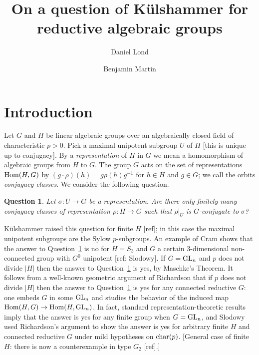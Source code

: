 \documentclass[12pt]{amsart}
\title[On a question of K\"ulshammer for reductive algebraic groups]
{On a question of K\"ulshammer for reductive algebraic groups}
\author[D. Lond]{Daniel Lond}
\author[B.\ Martin]{Benjamin Martin}
\newcommand\ra{\rightarrow}
\numberwithin{equation}{section}
\newtheorem{qn}[equation]{Question}
\theoremstyle{definition}
\theoremstyle{remark}
\theoremstyle{remark}
\begin{document}
\begin{abstract}
\end{abstract}


\maketitle

\section{Introduction}

Let $G$ and $H$ be linear algebraic groups over an algebraically closed field of characteristic $p> 0$.  Pick a maximal unipotent subgroup $U$ of $H$ [this is unique up to conjugacy].  By a {\em representation} of $H$ in $G$ we mean a homomorphism of algebraic groups from $H$ to $G$.  The group $G$ acts on the set of representations ${\rm Hom}(H,G)$ by $(g\cdot \rho)(h)= g\rho(h)g^{-1}$ for $h\in H$ and $g\in G$; we call the orbits {\em conjugacy classes}.  We consider the following question.

\begin{qn}
\label{qn:algKQ}
 Let $\sigma\colon U\ra G$ be a representation.  Are there only finitely many conjugacy classes of representation $\rho\colon H\ra G$ such that $\rho|_U$ is $G$-conjugate to $\sigma$?
\end{qn}

K\"ulshammer raised this question for finite $H$
[ref]; in this case the maximal unipotent subgroups are the Sylow $p$-subgroups.  An example of Cram shows that the answer to Question~\ref{qn:algKQ} is no for $H= S_3$ and $G$ a certain 3-dimensional non-connected group with $G^0$ unipotent [ref: Slodowy].
If $G= {\rm GL}_n$ and $p$ does not divide $|H|$ then the answer to Question~\ref{qn:algKQ} is yes, by Maschke's Theorem.  It follows from a well-known geometric argument of Richardson that if $p$ does not divide $|H|$ then the answer to Question~\ref{qn:algKQ} is yes for any connected reductive $G$: one embeds $G$ in some ${\rm GL}_n$ and studies the behavior of the induced map ${\rm Hom}(H,G)\ra {\rm Hom}(H,{\rm GL}_n)$.  In fact, standard representation-theoretic results imply that the answer is yes for any finite group when $G= {\rm GL}_n$, and Slodowy used Richardson's argument to show the answer is yes for arbitrary finite $H$ and connected reductive $G$ under mild hypotheses on ${\rm char}(p)$.  [General case of finite $H$: there is now a counterexample in type $G_2$ [ref].]
\end{document}
